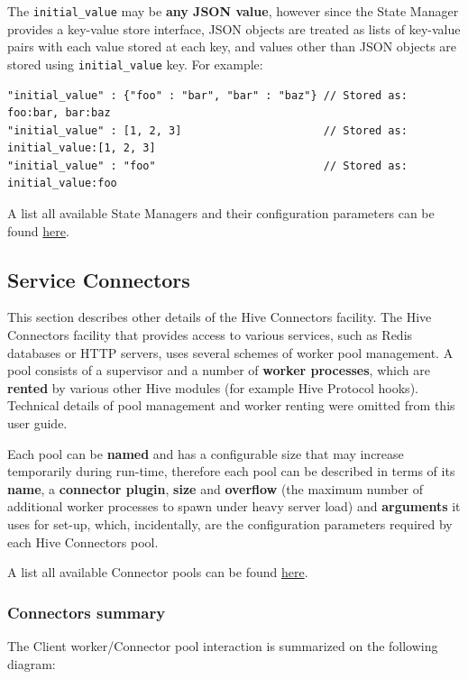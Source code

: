 \documentclass[a4paper]{article}
\begin{document}
The \texttt{initial\_value} may be \textbf{any JSON value}, however since the State Manager provides a key-value store interface, JSON objects are treated as lists of key-value pairs with each value stored at each key, and values other than JSON objects are stored using \texttt{initial\_value} key. For example:


\begin{verbatim}
"initial_value" : {"foo" : "bar", "bar" : "baz"} // Stored as:  foo:bar, bar:baz
"initial_value" : [1, 2, 3]                      // Stored as: initial_value:[1, 2, 3]
"initial_value" : "foo"                          // Stored as: initial_value:foo
\end{verbatim}




\noindent
A list all available State Managers and their configuration parameters can be found \hyperref[sec-9-5]{here}.
\subsection{Service Connectors}
\label{sec-7-2}

This section describes other details of the Hive Connectors facility. The Hive Connectors facility that provides access to various services, such as Redis databases or HTTP servers, uses several schemes of worker pool management. A pool consists of a supervisor and a number of \textbf{worker processes}, which are \textbf{rented} by various other Hive modules (for example Hive Protocol hooks). Technical details of pool management and worker renting were omitted from this user guide.

Each pool can be \textbf{named} and has a configurable size that may increase temporarily during run-time, therefore each pool can be described in terms of its \textbf{name}, a \textbf{connector plugin}, \textbf{size} and \textbf{overflow} (the maximum number of additional worker processes to spawn under heavy server load) and \textbf{arguments} it uses for set-up, which, incidentally, are the configuration parameters required by each Hive Connectors pool.

\noindent
A list all available Connector pools can be found \hyperref[sec-9-4]{here}.
\subsubsection{Connectors summary}
\label{sec-7-2-1}

The Client worker/Connector pool interaction is summarized on the following diagram:
\end{document}
